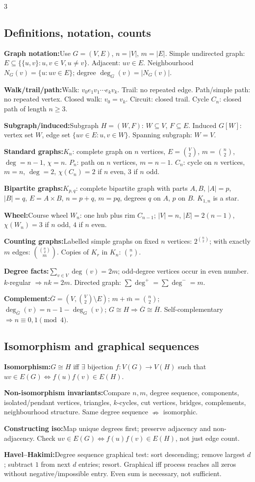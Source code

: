 \documentclass[10pt]{article}
\newenvironment{cheatitems}{\par\vspace{-1pt}}{\par\vspace{-1pt}}
\newcommand{\cheatrow}[2]{\par\noindent\textbf{#1:}\enspace #2\par}
\begin{document}
\begin{multicols}{3}
\subsection*{Definitions, notation, counts}
\begin{cheatitems}
\cheatrow{Graph notation}{Use $G=(V,E)$, $n=|V|$, $m=|E|$. Simple undirected graph: $E\subseteq\{\{u,v\}:u,v\in V,u\ne v\}$. Adjacent: $uv\in E$. Neighbourhood $N_G(v)=\{u:uv\in E\}$; degree $\deg_G(v)=|N_G(v)|$.}
\cheatrow{Walk/trail/path}{Walk: $v_0e_1v_1\cdots e_kv_k$. Trail: no repeated edge. Path/simple path: no repeated vertex. Closed walk: $v_0=v_k$. Circuit: closed trail. Cycle $C_n$: closed path of length $n\ge3$.}
\cheatrow{Subgraph/induced}{Subgraph $H=(W,F)$: $W\subseteq V$, $F\subseteq E$. Induced $G[W]$: vertex set $W$, edge set $\{uv\in E:u,v\in W\}$. Spanning subgraph: $W=V$.}
\cheatrow{Standard graphs}{$K_n$: complete graph on $n$ vertices, $E=\binom{V}{2}$, $m=\binom n2$, $\deg=n-1$, $\chi=n$. $P_n$: path on $n$ vertices, $m=n-1$. $C_n$: cycle on $n$ vertices, $m=n$, $\deg=2$, $\chi(C_n)=2$ if $n$ even, $3$ if $n$ odd.}
\cheatrow{Bipartite graphs}{$K_{p,q}$: complete bipartite graph with parts $A,B$, $|A|=p$, $|B|=q$, $E=A\times B$, $n=p+q$, $m=pq$, degrees $q$ on $A$, $p$ on $B$. $K_{1,n}$ is a star.}
\cheatrow{Wheel}{Course wheel $W_n$: one hub plus rim $C_{n-1}$; $|V|=n$, $|E|=2(n-1)$, $\chi(W_n)=3$ if $n$ odd, $4$ if $n$ even.}
\cheatrow{Counting graphs}{Labelled simple graphs on fixed $n$ vertices: $2^{\binom n2}$; with exactly $m$ edges: $\binom{\binom n2}{m}$. Copies of $K_r$ in $K_n$: $\binom nr$.}
\cheatrow{Degree facts}{$\sum_{v\in V}\deg(v)=2m$; odd-degree vertices occur in even number. $k$-regular $\Rightarrow nk=2m$. Directed graph: $\sum\deg^+=\sum\deg^-=m$.}
\cheatrow{Complement}{$\overline G=(V,\binom V2\setminus E)$; $m+\bar m=\binom n2$; $\deg_{\overline G}(v)=n-1-\deg_G(v)$; $G\cong H\Rightarrow\overline G\cong\overline H$. Self-complementary $\Rightarrow n\equiv0,1\pmod4$.}
\end{cheatitems}

\subsection*{Isomorphism and graphical sequences}
\begin{cheatitems}
\cheatrow{Isomorphism}{$G\cong H$ iff $\exists$ bijection $f:V(G)\to V(H)$ such that $uv\in E(G)\Leftrightarrow f(u)f(v)\in E(H)$.}
\cheatrow{Non-isomorphism invariants}{Compare $n,m$, degree sequence, components, isolated/pendant vertices, triangles, $k$-cycles, cut vertices, bridges, complements, neighbourhood structure. Same degree sequence $\nRightarrow$ isomorphic.}
\cheatrow{Constructing iso}{Map unique degrees first; preserve adjacency and non-adjacency. Check $uv\in E(G)\iff f(u)f(v)\in E(H)$, not just edge count.}
\cheatrow{Havel--Hakimi}{Degree sequence graphical test: sort descending; remove largest $d$; subtract $1$ from next $d$ entries; resort. Graphical iff process reaches all zeros without negative/impossible entry. Even sum is necessary, not sufficient.}
\end{cheatitems}


\end{multicols}
\end{document}
